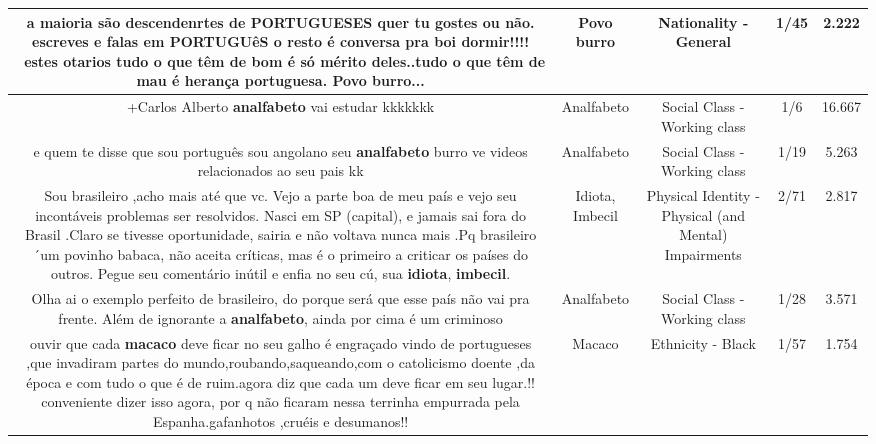 \documentclass[11pt]{article}
\newlength\mylength
\begin{document}
\begin{center}
\begin{longtable}{|C{.65\mylength}|C{.30\mylength}|C{.12\mylength}|C{.12\mylength}|C{.12\mylength}|}
  \small a maioria são descendenrtes de PORTUGUESES quer tu gostes ou não. escreves e falas em PORTUGUêS o resto é conversa pra boi dormir!!!!  estes otarios tudo o que têm de bom é só mérito deles..tudo o que têm de mau é herança portuguesa. \textbf{Povo burro}...\normalsize   & Povo burro & Nationality - General & 1/45 & 2.222 \\  \hline
  \small +Carlos Alberto \textbf{analfabeto} vai estudar kkkkkkk\normalsize   & Analfabeto & Social Class - Working class & 1/6 & 16.667 \\  \hline
  \small e quem te disse que sou português sou angolano seu \textbf{analfabeto} burro ve videos relacionados ao seu pais kk\normalsize   & Analfabeto & Social Class - Working class & 1/19 & 5.263 \\  \hline
  \small Sou brasileiro ,acho mais até que vc. Vejo a parte boa de meu país e vejo seu incontáveis problemas  ser resolvidos. Nasci em SP (capital), e jamais sai fora do Brasil .Claro se tivesse oportunidade, sairia e não voltava nunca mais .Pq brasileiro ´um povinho babaca, não aceita críticas, mas é o primeiro a criticar os países do outros. Pegue seu comentário inútil e enfia no seu cú, sua \textbf{idiota}, \textbf{imbecil}.\normalsize   & Idiota, Imbecil & Physical Identity - Physical (and Mental) Impairments & 2/71 & 2.817 \\  \hline
  \small Olha ai o exemplo perfeito de brasileiro, do porque será que esse país não vai pra frente. Além de ignorante a \textbf{analfabeto}, ainda por cima é um criminoso\normalsize   & Analfabeto & Social Class - Working class & 1/28 & 3.571 \\  \hline
  \small ouvir que cada \textbf{macaco} deve ficar no seu galho é engraçado vindo de portugueses ,que invadiram partes do mundo,roubando,saqueando,com o catolicismo doente ,da época e com tudo o que é de ruim.agora diz que cada um deve ficar em seu lugar.!!  conveniente dizer isso agora, por  q não ficaram nessa terrinha empurrada pela Espanha.gafanhotos ,cruéis e desumanos!!\normalsize   & Macaco & Ethnicity - Black & 1/57 & 1.754 \\  \hline

\end{longtable}
\end{center}
\end{document}
